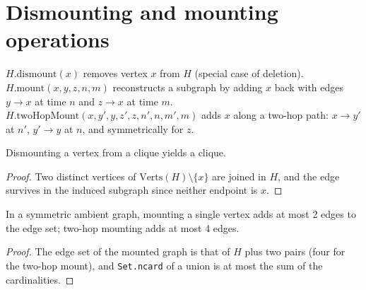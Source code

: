 \section*{Dismounting and mounting operations}

\begin{definition}
  \label{def:dismount-mount}
  \leanok
  $H.\mathrm{dismount}(x)$ removes vertex $x$ from $H$ (special case of
  deletion). $H.\mathrm{mount}(x, y, z, n, m)$ reconstructs a subgraph by
  adding $x$ back with edges $y \to x$ at time $n$ and $z \to x$ at time $m$.
  $H.\mathrm{twoHopMount}(x, y', y, z', z, n', n, m', m)$ adds $x$ along a
  two-hop path: $x \to y'$ at $n'$, $y' \to y$ at $n$, and symmetrically for
  $z$.
\end{definition}

\begin{lemma}
  \label{lem:dismount-clique}
  \leanok
  Dismounting a vertex from a clique yields a clique.
\end{lemma}

\begin{proof}
  \leanok
  Two distinct vertices of $\mathrm{Verts}(H) \setminus \{x\}$ are joined in $H$, and the edge survives in the induced subgraph since neither endpoint is $x$.
\end{proof}

\begin{lemma}
  \label{lem:mount-size}
  \leanok
  In a symmetric ambient graph, mounting a single vertex adds at most 2 edges
  to the edge set; two-hop mounting adds at most 4 edges.
\end{lemma}

\begin{proof}
  \leanok
  The edge set of the mounted graph is that of $H$ plus two pairs (four for the two-hop mount), and \texttt{Set.ncard} of a union is at most the sum of the cardinalities.
\end{proof}

